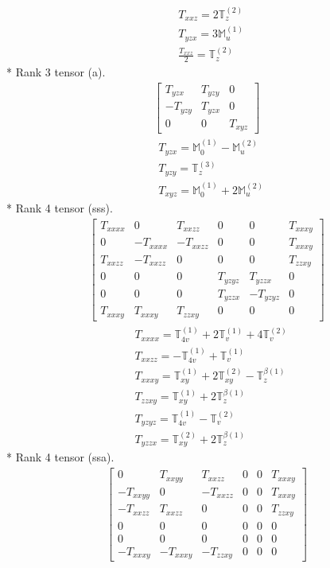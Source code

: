 \documentclass[fleqn,8pt,landscape]{jsarticle}
\begin{document}
\begin{align*}
& T_{xxz} = 2 \mathbb{T}_{z}^{(2)} \\
& T_{yzx} = 3 \mathbb{M}_{u}^{(1)} \\
& \frac{T_{xxz}}{2} = \mathbb{T}_{z}^{(2)}
\end{align*}
* Rank 3 tensor (a).
\begin{align*}
\begin{bmatrix} T_{yzx} & T_{yzy} & 0 \\ - T_{yzy} & T_{yzx} & 0 \\ 0 & 0 & T_{xyz} \end{bmatrix}
\end{align*}
\begin{align*}
& T_{yzx} = \mathbb{M}_{0}^{(1)} - \mathbb{M}_{u}^{(2)} \\
& T_{yzy} = \mathbb{T}_{z}^{(3)} \\
& T_{xyz} = \mathbb{M}_{0}^{(1)} + 2 \mathbb{M}_{u}^{(2)}
\end{align*}
* Rank 4 tensor (sss).
\begin{align*}
\begin{bmatrix} T_{xxxx} & 0 & T_{xxzz} & 0 & 0 & T_{xxxy} \\ 0 & - T_{xxxx} & - T_{xxzz} & 0 & 0 & T_{xxxy} \\ T_{xxzz} & - T_{xxzz} & 0 & 0 & 0 & T_{zzxy} \\ 0 & 0 & 0 & T_{yzyz} & T_{yzzx} & 0 \\ 0 & 0 & 0 & T_{yzzx} & - T_{yzyz} & 0 \\ T_{xxxy} & T_{xxxy} & T_{zzxy} & 0 & 0 & 0 \end{bmatrix}
\end{align*}
\begin{align*}
& T_{xxxx} = \mathbb{T}_{4v}^{(1)} + 2 \mathbb{T}_{v}^{(1)} + 4 \mathbb{T}_{v}^{(2)} \\
& T_{xxzz} = - \mathbb{T}_{4v}^{(1)} + \mathbb{T}_{v}^{(1)} \\
& T_{xxxy} = \mathbb{T}_{xy}^{(1)} + 2 \mathbb{T}_{xy}^{(2)} - \mathbb{T}_{z}^{\beta(1)} \\
& T_{zzxy} = \mathbb{T}_{xy}^{(1)} + 2 \mathbb{T}_{z}^{\beta(1)} \\
& T_{yzyz} = \mathbb{T}_{4v}^{(1)} - \mathbb{T}_{v}^{(2)} \\
& T_{yzzx} = \mathbb{T}_{xy}^{(2)} + 2 \mathbb{T}_{z}^{\beta(1)}
\end{align*}
* Rank 4 tensor (ssa).
\begin{align*}
\begin{bmatrix} 0 & T_{xxyy} & T_{xxzz} & 0 & 0 & T_{xxxy} \\ - T_{xxyy} & 0 & - T_{xxzz} & 0 & 0 & T_{xxxy} \\ - T_{xxzz} & T_{xxzz} & 0 & 0 & 0 & T_{zzxy} \\ 0 & 0 & 0 & 0 & 0 & 0 \\ 0 & 0 & 0 & 0 & 0 & 0 \\ - T_{xxxy} & - T_{xxxy} & - T_{zzxy} & 0 & 0 & 0 \end{bmatrix}
\end{align*}
\end{document}
